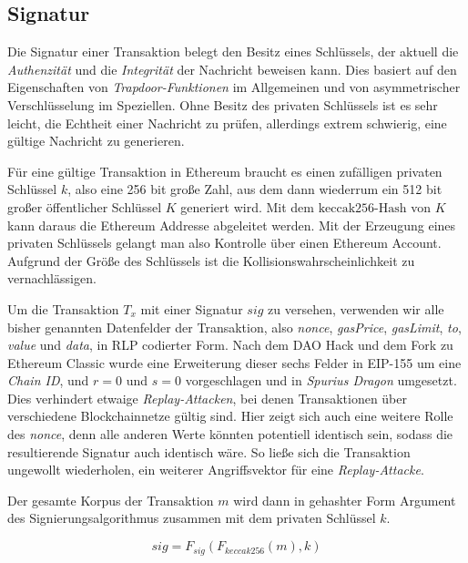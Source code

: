 \documentclass[runningheads]{llncs}
\begin{document}
\subsection{Signatur}
Die Signatur einer Transaktion belegt den Besitz eines Schlüssels, der aktuell die \textit{Authenzität} und die \textit{Integrität} der Nachricht beweisen kann. Dies basiert auf den Eigenschaften von \textit{Trapdoor-Funktionen} im Allgemeinen und von asymmetrischer Verschlüsselung im Speziellen. Ohne Besitz des privaten Schlüssels ist es sehr leicht, die Echtheit einer Nachricht zu prüfen, allerdings extrem schwierig, eine gültige Nachricht zu generieren. \cite{roeder_asymmetric-key_nodate}

Für eine gültige Transaktion in Ethereum braucht es einen zufälligen privaten Schlüssel $ k $, also eine 256 bit große Zahl, aus dem dann wiederrum ein 512 bit großer öffentlicher Schlüssel $ K $ generiert wird. Mit dem $ \text{keccak256-Hash} $ von $ K $ kann daraus die Ethereum Addresse abgeleitet werden. Mit der Erzeugung eines privaten Schlüssels gelangt man also Kontrolle über einen Ethereum Account. Aufgrund der Größe des Schlüssels ist die Kollisionswahrscheinlichkeit zu vernachlässigen.

Um die Transaktion $ T_x $ mit einer Signatur $ sig $ zu versehen, verwenden wir alle bisher genannten Datenfelder der Transaktion, also \textit{nonce}, \textit{gasPrice}, \textit{gasLimit}, \textit{to}, \textit{value} und \textit{data}, in RLP codierter Form. Nach dem DAO Hack und dem Fork zu Ethereum Classic wurde eine Erweiterung dieser sechs Felder in EIP-155 \cite{noauthor_ethereum/eips_nodate} um eine \textit{Chain ID}, und $ r = 0 $ und $ s = 0 $ vorgeschlagen und in \textit{Spurius Dragon} umgesetzt. Dies verhindert etwaige \textit{Replay-Attacken}, bei denen Transaktionen über verschiedene Blockchainnetze gültig sind. \cite[S. 138]{iyer_cryptoeconomics_2018} Hier zeigt sich auch eine weitere Rolle des \textit{nonce}, denn alle anderen Werte könnten potentiell identisch sein, sodass die resultierende Signatur auch identisch wäre. So ließe sich die Transaktion ungewollt wiederholen, ein weiterer Angriffsvektor für eine \textit{Replay-Attacke}.

Der gesamte Korpus der Transaktion $ m $ wird dann in gehashter Form Argument des Signierungsalgorithmus zusammen mit dem privaten Schlüssel $ k $.

$$
  sig = F_{sig}(F_{keccak256}(m), k)
$$
\end{document}
